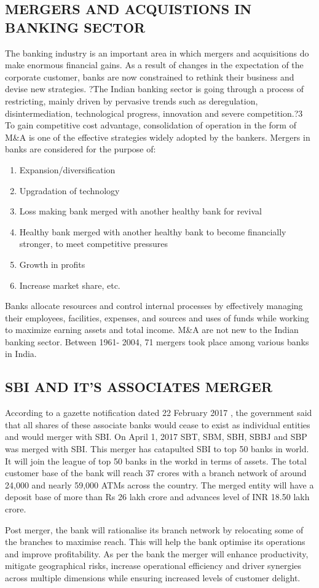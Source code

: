 \documentclass[a4paper, 14pt]{extarticle}
\begin{document}
{\subsection{MERGERS AND ACQUISTIONS IN BANKING SECTOR}
The banking industry is an important area in which mergers and acquisitions do make enormous financial gains. As a result of changes in the expectation of the corporate customer, banks are now constrained to rethink their business and devise new strategies. ?The Indian banking sector is going through a process of restricting, mainly driven by pervasive trends such as deregulation, disintermediation, technological progress, innovation and severe competition.?3 To gain competitive cost advantage, consolidation of operation in the form of M\&A is one of the effective strategies widely adopted by the bankers. Mergers in banks are considered for the purpose of:
\begin{enumerate}
\item Expansion/diversification
\item Upgradation of technology
\item Loss making bank merged with another healthy bank for revival
\item Healthy bank merged with another healthy bank to become financially
stronger, to meet competitive pressures
\item Growth in profits
\item Increase market share, etc.
\end{enumerate}
Banks allocate resources and control internal processes by effectively
managing their employees, facilities, expenses, and sources and uses of funds while working to maximize earning assets and total income. M\&A are not new to the Indian banking sector. Between 1961- 2004, 71 mergers took place among various banks in India.
\subsection {SBI AND IT'S ASSOCIATES MERGER}
\par According to a gazette notification dated 22 February 2017 , the government said that all shares of these associate banks would cease to exist as individual entities and would merger with SBI. On April 1, 2017 SBT, SBM, SBH, SBBJ and SBP was merged with SBI. This merger has catapulted SBI to top 50 banks in world. It will join the league of top 50 banks in the workd in terms of assets. The total customer base of the bank will reach 37 crores with a branch network of around 24,000 and nearly 59,000 ATMs across the country. The merged entity will have a deposit base of more than Rs 26 lakh crore and advances level of INR 18.50 lakh crore.
\par Post merger, the bank will rationalise its branch network by relocating some of the branches to maximise reach. This will help the bank optimise its operations and improve profitability. As per the bank the merger will enhance productivity, mitigate geographical risks, increase operational efficiency and driver synergies across multiple dimensions while ensuring increased levels of customer delight.

}
\end{document}
